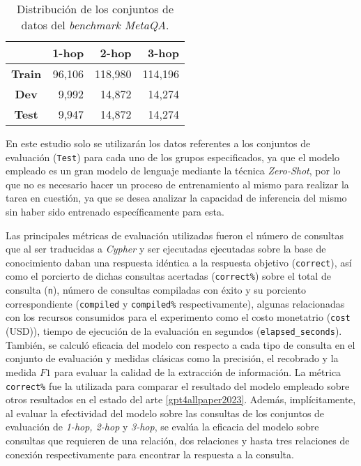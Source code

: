 \begin{table}[h]
\centering
\begin{tabular}{|c|r|r|r|}
\hline
 & \textbf{1-hop} & \textbf{2-hop} & \textbf{3-hop} \\ \hline
\textbf{Train} & 96,106 & 118,980 & 114,196 \\ \hline
\textbf{Dev} & 9,992 & 14,872 & 14,274 \\ \hline
\textbf{Test} & 9,947 & 14,872 & 14,274 \\ \hline
\end{tabular}
\caption{Distribución de los conjuntos de datos del \textit{benchmark MetaQA}.}
\label{tab:metaqatable}
\end{table}

En este estudio solo se utilizarán los datos referentes a los conjuntos de evaluación (\texttt{Test}) para cada uno de los grupos especificados, ya que el modelo empleado es un gran modelo de lenguaje mediante la técnica \textit{Zero-Shot}, por lo que no es necesario hacer un proceso de entrenamiento al mismo para realizar la tarea en cuestión, ya que se desea analizar la capacidad de inferencia del mismo sin haber sido entrenado específicamente para esta.

Las principales métricas de evaluación utilizadas fueron el número de consultas que al ser traducidas a \textit{Cypher} y ser ejecutadas ejecutadas sobre la base de conocimiento daban una respuesta idéntica a la respuesta objetivo (\texttt{correct}), así como el porcierto de dichas consultas acertadas (\texttt{correct\%}) sobre el total de consulta (\texttt{n}), número de consultas compiladas con éxito y su porciento correspondiente (\texttt{compiled} y \texttt{compiled\%} respectivamente), algunas relacionadas con los recursos consumidos para el experimento como el costo monetatrio (\texttt{cost} (USD)), tiempo de ejecución de la evaluación en segundos (\texttt{elapsed\_seconds}). También, se calculó eficacia del modelo con respecto a cada tipo de consulta en el conjunto de evaluación y medidas clásicas como la precisión, el recobrado y la medida $F1$ para evaluar la calidad de la extracción de información. La métrica \texttt{correct\%} fue la utilizada para comparar el resultado del modelo empleado sobre otros resultados en el estado del arte \ref{gpt4allpaper2023}. Además, implícitamente, al evaluar la efectividad del modelo sobre las consultas de los conjuntos de evaluación de \textit{1-hop, 2-hop} y \textit{3-hop}, se evalúa la eficacia del modelo sobre consultas que requieren de una relación, dos relaciones y hasta tres relaciones de conexión respectivamente para encontrar la respuesta a la consulta.

